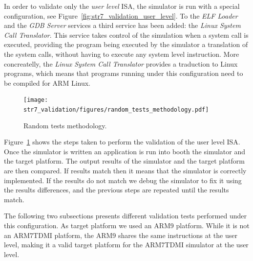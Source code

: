 In order to validate only the \textit{user level} ISA, the simulator is run with a special configuration, see Figure~\ref{fig:str7_validation_user_level}.
To the \textit{ELF Loader} and the \textit{GDB Server} services a third service has been added: the \textit{Linux System Call Translator}.
This service takes control of the simulation when a system call is executed, providing the program being executed by the simulator a translation of the system calls, without having to execute any system level instruction.
More concreatelly, the \textit{Linux System Call Translator} provides a traduction to Linux programs, which means that programs running under this configuration need to be compiled for ARM Linux.

\begin{figure}[!h]
	\begin{center}
		\texttt{[image: str7\_validation/figures/random\_tests\_methodology.pdf]}
	\end{center}
	\caption{Random tests methodology.}
	\label{fig:str7_validation_random_tests_methodology}
\end{figure}

Figure~\ref{fig:str7_validation_random_tests_methodology} shows the steps taken to perform the validation of the user level ISA.
Once the simulator is written an application is run into booth the simulator and the target platform.
The output results of the simulator and the target platform are then compared.
If results match then it means that the simulator is correctly implemented.
If the results do not match we debug the simulator to fix it using the results differences, and the previous steps are repeated until the results match.

The following two subsections presents different validation tests performed under this configuration.
As target platform we used an ARM9 platform.
While it is not an ARM7TDMI platform, the ARM9 shares the same instructions at the user level, making it a valid target platform for the ARM7TDMI simulator at the user level.





